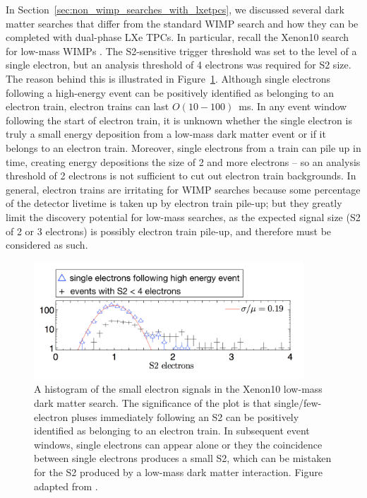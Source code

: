 In Section~\ref{sec:non_wimp_searches_with_lxetpcs}, we discussed several dark matter searches that differ from the standard \ac{WIMP} search and how they can be completed with dual-phase \ac{LXe} \ac{TPC}s. In particular, recall the Xenon10 search for low-mass \ac{WIMP}s \cite{Angle2011}. The S2-sensitive trigger threshold was set to the level of a single electron, but an analysis threshold of 4 electrons was required for S2 size. The reason behind this is illustrated in Figure~\ref{fig:xenon10_s2s}. Although single electrons following a high-energy event can be positively identified as belonging to an electron train, electron trains can last $O(10-100)$~ms. In any event window following the start of electron train, it is unknown whether the single electron is truly a small energy deposition from a low-mass dark matter event or if it belongs to an electron train. Moreover, single electrons from a train can pile up in time, creating energy depositions the size of 2 and more electrons -- so an analysis threshold of 2 electrons is not sufficient to cut out electron train backgrounds. In general, electron trains are irritating for \ac{WIMP} searches because some percentage of the detector livetime is taken up by electron train pile-up; but they greatly limit the discovery potential for low-mass searches, as the expected signal size (S2 of 2 or 3 electrons) is possibly electron train pile-up, and therefore must be considered as such.

\begin{figure}[htbp]
\begin{center}
\includegraphics[width=0.9\textwidth]{figures/etrains/xenon10_s2s.png}
\caption{A histogram of the small electron signals in the Xenon10 low-mass dark matter search. The significance of the plot is that single/few-electron pluses immediately following an S2 can be positively identified as belonging to an electron train. In subsequent event windows, single electrons can appear alone or they the coincidence between single electrons produces a small S2, which can be mistaken for the S2 produced by a low-mass dark matter interaction. Figure adapted from \cite{Angle2011}.}
\label{fig:xenon10_s2s}
\end{center}
\end{figure}

